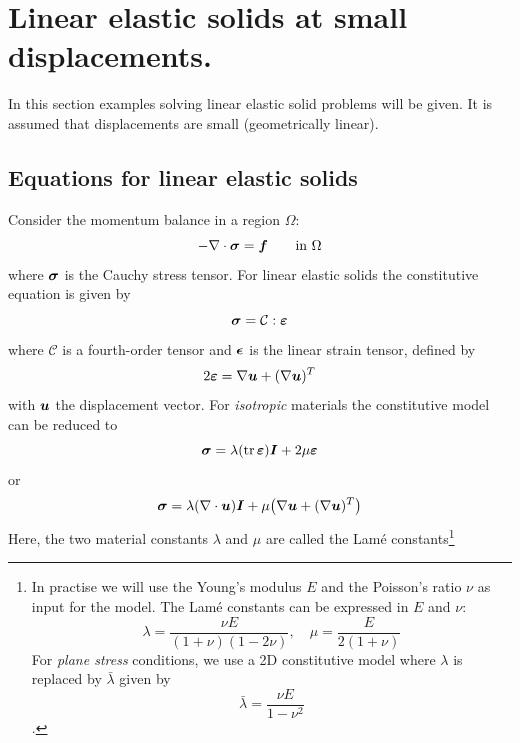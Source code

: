 
\def\headdate{2nd February 2020}

\section{Linear elastic solids at small displacements.}
\label{sec:linear_elastic}
In this section examples solving linear elastic solid problems will be given. It is assumed that displacements are small (geometrically linear).

\subsection{Equations for linear elastic solids}
\label{sec:linear_elastic_eq}

Consider the momentum balance in a region $\Omega$:
\begin{equation}
 -\nabla\cdot\boldsymbol{\sigma}=\boldsymbol{f}\qquad\text{in }\Omega
 \label{eq:mombal1}
\end{equation}
where $\boldsymbol{\sigma}$ is the Cauchy stress tensor. For linear elastic solids the constitutive equation is given by
\begin{equation}
   \boldsymbol{\sigma} = \mathcal{C}:\boldsymbol{\varepsilon}
\end{equation}
where $\mathcal{C}$ is a fourth-order tensor and $\boldsymbol{\epsilon}$ is the linear strain tensor, defined by
\begin{equation}
 2\boldsymbol{\varepsilon}=\nabla\boldsymbol{u}+(\nabla\boldsymbol{u})^T
\end{equation}
with $\boldsymbol{u}$ the displacement vector. For \emph{isotropic} materials the constitutive model can be reduced to
\begin{equation}
   \boldsymbol{\sigma} = \lambda(\operatorname{tr}\boldsymbol{\varepsilon})\boldsymbol{I}+2\mu\boldsymbol{\varepsilon}
\end{equation}
or
\begin{equation}
 \boldsymbol{\sigma} = \lambda(\nabla\cdot\boldsymbol{u})\boldsymbol{I}+\mu\big(\nabla\boldsymbol{u}+(\nabla\boldsymbol{u})^T\big)
\label{eq:Hooke1}
\end{equation}
Here, the two material constants $\lambda$ and $\mu$ are called the Lam\'e constants\footnote{In practise we will use the Young's modulus $E$ and the Poisson's ratio $\nu$ as input for the model. The Lam\'e constants can be expressed in $E$ and $\nu$:
\[ \lambda=\frac{\nu E}{(1+\nu)(1-2\nu)}, \quad \mu=\frac{E}{2(1+\nu)}\]
For \emph{plane stress} conditions, we use a 2D constitutive model where $\lambda$ is replaced by
$\bar\lambda$ given by
\[\bar\lambda=\frac{\nu E}{1-\nu^2}\].}

